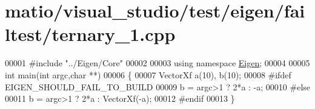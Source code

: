 \hypertarget{matio_2visual__studio_2test_2eigen_2failtest_2ternary__1_8cpp_source}{}\section{matio/visual\+\_\+studio/test/eigen/failtest/ternary\+\_\+1.cpp}
\label{matio_2visual__studio_2test_2eigen_2failtest_2ternary__1_8cpp_source}

\begin{DoxyCode}
00001 \textcolor{preprocessor}{#include "../Eigen/Core"}
00002 
00003 \textcolor{keyword}{using namespace }\hyperlink{namespace_eigen}{Eigen};
00004 
00005 \textcolor{keywordtype}{int} main(\textcolor{keywordtype}{int} argc,\textcolor{keywordtype}{char} **)
00006 \{
00007   VectorXf a(10), b(10);
00008 \textcolor{preprocessor}{#ifdef EIGEN\_SHOULD\_FAIL\_TO\_BUILD}
00009   b = argc>1 ? 2*a : -a;
00010 \textcolor{preprocessor}{#else}
00011   b = argc>1 ? 2*a : VectorXf(-a);
00012 \textcolor{preprocessor}{#endif}
00013 \}
\end{DoxyCode}
